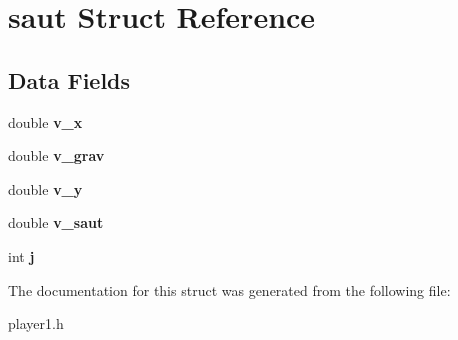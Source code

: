 \hypertarget{structsaut}{}\section{saut Struct Reference}
\label{structsaut}
\subsection*{Data Fields}
\begin{DoxyCompactItemize}
\item 
double {\bfseries v\+\_\+x}\hypertarget{structsaut_abe061f098408bba736c245a7de3400fd}{}\label{structsaut_abe061f098408bba736c245a7de3400fd}

\item 
double {\bfseries v\+\_\+grav}\hypertarget{structsaut_a735acd0f485c7bc699f61f58f1c369e3}{}\label{structsaut_a735acd0f485c7bc699f61f58f1c369e3}

\item 
double {\bfseries v\+\_\+y}\hypertarget{structsaut_a66b1523dfbe75db5624a4557b172761e}{}\label{structsaut_a66b1523dfbe75db5624a4557b172761e}

\item 
double {\bfseries v\+\_\+saut}\hypertarget{structsaut_a561eaf54b7d3270b8c669694ba7013a0}{}\label{structsaut_a561eaf54b7d3270b8c669694ba7013a0}

\item 
int {\bfseries j}\hypertarget{structsaut_a1fd86c2875275e9646a4d4497c0aa471}{}\label{structsaut_a1fd86c2875275e9646a4d4497c0aa471}

\end{DoxyCompactItemize}


The documentation for this struct was generated from the following file\+:\begin{DoxyCompactItemize}
\item 
player1.\+h\end{DoxyCompactItemize}
